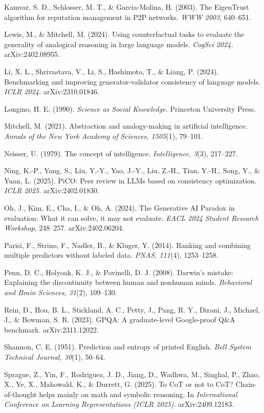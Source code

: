 \documentclass{article}
\begin{document}
Kamvar, S. D., Schlosser, M. T., \& Garcia-Molina, H. (2003). The EigenTrust algorithm for reputation management in P2P networks. \emph{WWW 2003}, 640--651.

Lewis, M., \& Mitchell, M. (2024). Using counterfactual tasks to evaluate the generality of analogical reasoning in large language models. \emph{CogSci 2024.} arXiv:2402.08955.

Li, X. L., Shrivastava, V., Li, S., Hashimoto, T., \& Liang, P. (2024). Benchmarking and improving generator-validator consistency of language models. \emph{ICLR 2024.} arXiv:2310.01846.

Longino, H. E. (1990). \emph{Science as Social Knowledge.} Princeton University Press.

Mitchell, M. (2021). Abstraction and analogy-making in artificial intelligence. \emph{Annals of the New York Academy of Sciences, 1505}(1), 79--101.

Neisser, U. (1979). The concept of intelligence. \emph{Intelligence, 3}(3), 217--227.

Ning, K.-P., Yang, S., Liu, Y.-Y., Yao, J.-Y., Liu, Z.-H., Tian, Y.-H., Song, Y., \& Yuan, L. (2025). PiCO: Peer review in LLMs based on consistency optimization. \emph{ICLR 2025.} arXiv:2402.01830.

Oh, J., Kim, E., Cha, I., \& Oh, A. (2024). The Generative AI Paradox in evaluation: What it can solve, it may not evaluate. \emph{EACL 2024 Student Research Workshop}, 248--257. arXiv:2402.06204.

Parisi, F., Strino, F., Nadler, B., \& Kluger, Y. (2014). Ranking and combining multiple predictors without labeled data. \emph{PNAS, 111}(4), 1253--1258.

Penn, D. C., Holyoak, K. J., \& Povinelli, D. J. (2008). Darwin's mistake: Explaining the discontinuity between human and nonhuman minds. \emph{Behavioral and Brain Sciences, 31}(2), 109--130.

Rein, D., Hou, B. L., Stickland, A. C., Petty, J., Pang, R. Y., Dirani, J., Michael, J., \& Bowman, S. R. (2023). GPQA: A graduate-level Google-proof Q\&A benchmark. arXiv:2311.12022.

Shannon, C. E. (1951). Prediction and entropy of printed English. \emph{Bell System Technical Journal, 30}(1), 50--64.

Sprague, Z., Yin, F., Rodriguez, J. D., Jiang, D., Wadhwa, M., Singhal, P., Zhao, X., Ye, X., Mahowald, K., \& Durrett, G. (2025). To CoT or not to CoT? Chain-of-thought helps mainly on math and symbolic reasoning. In \emph{International Conference on Learning Representations (ICLR 2025)}. arXiv:2409.12183.
\end{document}

